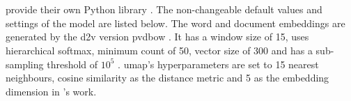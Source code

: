 \section{\topTwovec{}}\label{sec:impl-top2vec}

\citeauthor{Top2Vec2020} provide their own Python library \topTwovec{} \cite{Top2Vec2020}.
The non-changeable default values and settings of the model are listed below.
The word and document embeddings are generated by the \ac{d2v} version \ac{pvdbow} \cite{Top2Vec2020}.
It has a window size of 15, uses hierarchical softmax, minimum count of 50, vector size of 300 and has a sub-sampling threshold of $10^5$ \cite{Top2Vec2020}.
\ac{umap}'s hyperparameters are set to 15 nearest neighbours, cosine similarity as the distance metric and 5 as the embedding dimension in \citeauthor{Top2Vec2020}'s work.

